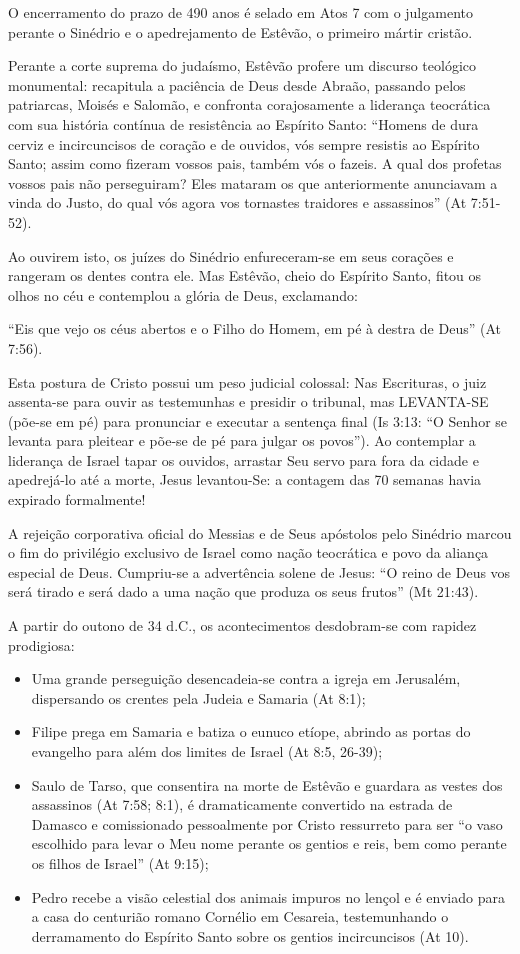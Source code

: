 \documentclass[11pt,a4paper,openany]{book}
\begin{document}
O encerramento do prazo de 490 anos é selado em Atos 7 com o julgamento perante o Sinédrio e o apedrejamento de Estêvão, o primeiro mártir cristão.

Perante a corte suprema do judaísmo, Estêvão profere um discurso teológico monumental: recapitula a paciência de Deus desde Abraão, passando pelos patriarcas, Moisés e Salomão, e confronta corajosamente a liderança teocrática com sua história contínua de resistência ao Espírito Santo: ``Homens de dura cerviz e incircuncisos de coração e de ouvidos, vós sempre resistis ao Espírito Santo; assim como fizeram vossos pais, também vós o fazeis. A qual dos profetas vossos pais não perseguiram? Eles mataram os que anteriormente anunciavam a vinda do Justo, do qual vós agora vos tornastes traidores e assassinos'' (At 7:51-52).

Ao ouvirem isto, os juízes do Sinédrio enfureceram-se em seus corações e rangeram os dentes contra ele. Mas Estêvão, cheio do Espírito Santo, fitou os olhos no céu e contemplou a glória de Deus, exclamando:

``Eis que vejo os céus abertos e o Filho do Homem, em pé à destra de Deus'' (At 7:56).

Esta postura de Cristo possui um peso judicial colossal:
Nas Escrituras, o juiz assenta-se para ouvir as testemunhas e presidir o tribunal, mas LEVANTA-SE (põe-se em pé) para pronunciar e executar a sentença final (Is 3:13: ``O Senhor se levanta para pleitear e põe-se de pé para julgar os povos''). Ao contemplar a liderança de Israel tapar os ouvidos, arrastar Seu servo para fora da cidade e apedrejá-lo até a morte, Jesus levantou-Se: a contagem das 70 semanas havia expirado formalmente!

A rejeição corporativa oficial do Messias e de Seus apóstolos pelo Sinédrio marcou o fim do privilégio exclusivo de Israel como nação teocrática e povo da aliança especial de Deus. Cumpriu-se a advertência solene de Jesus: ``O reino de Deus vos será tirado e será dado a uma nação que produza os seus frutos'' (Mt 21:43).

A partir do outono de 34 d.C., os acontecimentos desdobram-se com rapidez prodigiosa:
\begin{itemize}
  \item Uma grande perseguição desencadeia-se contra a igreja em Jerusalém, dispersando os crentes pela Judeia e Samaria (At 8:1);
  \item Filipe prega em Samaria e batiza o eunuco etíope, abrindo as portas do evangelho para além dos limites de Israel (At 8:5, 26-39);
  \item Saulo de Tarso, que consentira na morte de Estêvão e guardara as vestes dos assassinos (At 7:58; 8:1), é dramaticamente convertido na estrada de Damasco e comissionado pessoalmente por Cristo ressurreto para ser ``o vaso escolhido para levar o Meu nome perante os gentios e reis, bem como perante os filhos de Israel'' (At 9:15);
  \item Pedro recebe a visão celestial dos animais impuros no lençol e é enviado para a casa do centurião romano Cornélio em Cesareia, testemunhando o derramamento do Espírito Santo sobre os gentios incircuncisos (At 10).
\end{itemize}
\end{document}
